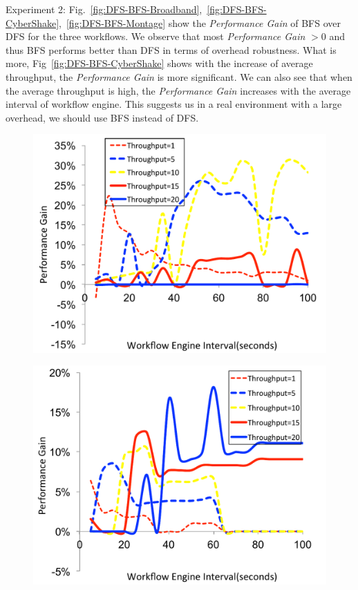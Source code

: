 Experiment 2: Fig.~\ref{fig:DFS-BFS-Broadband},~\ref{fig:DFS-BFS-CyberShake},~\ref{fig:DFS-BFS-Montage} show the \emph{Performance Gain} of BFS over DFS for the three workflows. We observe that most  \emph{Performance Gain} $>0$ and thus BFS performs better than DFS in terms of overhead robustness. What is more, Fig~\ref{fig:DFS-BFS-CyberShake} shows with the increase of average throughput, the \emph{Performance Gain} is more significant. We can also see that when the average throughput is high, the \emph{Performance Gain} increases with the average interval of workflow engine. This suggests us in a real environment with a large overhead, we should use BFS instead of DFS. 


\begin{figure}[!htb]
\centering
 \includegraphics[width=0.9\linewidth]{figure/UFFS-FFS-Broadband.pdf}
  \label{fig:UFFS-FFS-Broadband}
\end{figure}

\begin{figure}[!htb]
\centering
 \includegraphics[width=0.9\linewidth]{figure/UFFS-FFS-CyberShake.pdf}
  \label{fig:UFFS-FFS-CyberShake}
\end{figure}

